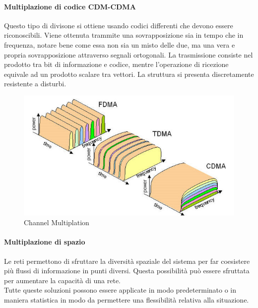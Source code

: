 \documentclass[12pt]{article}
\begin{document}
\paragraph{Multiplazione di codice CDM-CDMA}
Questo tipo di divisone si ottiene usando codici differenti che devono essere riconoscibili. Viene ottenuta trammite una sovrapposizione sia in tempo che in frequenza, notare bene come essa non sia un misto delle due, ma una vera e propria sovrapposizione attraverso segnali ortogonali. La trasmissione consiste nel prodotto tra bit di informazione e codice, mentre l'operazione di ricezione equivale ad un prodotto scalare tra vettori. La struttura si presenta discretamente resistente a disturbi.\\
\begin{figure}[h!]
  \includegraphics[width=\linewidth]{images/csma.jpg}
  \caption{Channel Multiplation}
  \label{fig:cmult}
\end{figure}

\paragraph{Multiplazione di spazio}
Le reti permettono di sfruttare la diversità spaziale del sistema per far coesistere più flussi di informazione in punti diversi. Questa possibilità può essere sfruttata per aumentare la capacità di una rete.\\
Tutte queste soluzioni possono essere applicate in modo predeterminato o in maniera statistica in modo da permettere una flessibilità relativa alla situazione.
\end{document}
